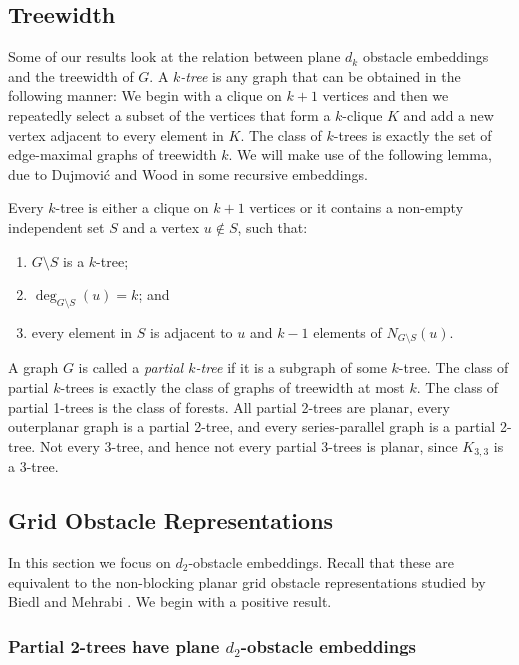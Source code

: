 \documentclass{patmorin}
\begin{document}
\subsection{Treewidth}

Some of our results look at the relation between plane $d_k$ obstacle
embeddings and the treewidth of $G$.  A \emph{$k$-tree} is any graph that
can be obtained in the following manner:  We begin with a clique on $k+1$
vertices and then we repeatedly select a subset of the vertices that
form a $k$-clique $K$ and add a new vertex adjacent to every element
in $K$.  The class of $k$-trees is exactly the set of edge-maximal
graphs of treewidth $k$.  We will make use of the following lemma,
due to Dujmovi\'c and Wood \cite[Lemma~1]{dujmovic.wood:graph2007}
in some recursive embeddings.

\begin{lem}
   Every $k$-tree is either a clique on $k+1$ vertices or it contains a non-empty independent set $S$ and a vertex $u\not\in S$, such that:
\begin{enumerate}
   \item $G\setminus S$ is a $k$-tree;
   \item $\deg_{G\setminus S}(u)=k$; and 
   \item every element in $S$ is adjacent to $u$ and $k-1$ elements of
   $N_{G\setminus S}(u)$.
\end{enumerate}
\end{lem}

A graph $G$ is called a \emph{partial $k$-tree} if it is a subgraph of
some $k$-tree.  The class of partial $k$-trees is exactly the class of
graphs of treewidth at most $k$.  The class of partial 1-trees is the
class of forests.  All partial 2-trees are planar, every outerplanar graph
is a partial 2-tree, and every series-parallel graph is a partial 2-tree.
Not every 3-tree, and hence not every partial 3-trees is planar, since
$K_{3,3}$ is a 3-tree.

\subsection{Grid Obstacle Representations}

In this section we focus on $d_2$-obstacle embeddings.  Recall that these
are equivalent to the non-blocking planar grid obstacle representations
studied by Biedl and Mehrabi \cite{X}.  We begin with a positive result.

\subsubsection{Partial 2-trees have plane $d_2$-obstacle embeddings}
\end{document}
